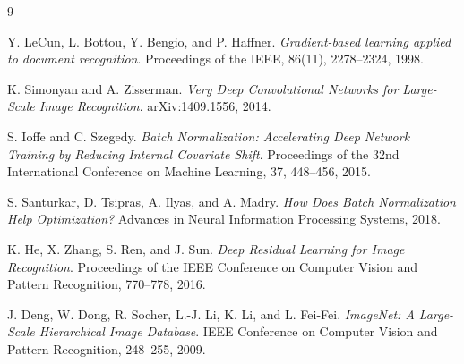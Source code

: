 \documentclass[11pt,a4paper]{article}
\begin{document}
\begin{thebibliography}{9}

Y. LeCun, L. Bottou, Y. Bengio, and P. Haffner.
\textit{Gradient-based learning applied to document recognition}.
Proceedings of the IEEE, 86(11), 2278--2324, 1998.

K. Simonyan and A. Zisserman.
\textit{Very Deep Convolutional Networks for Large-Scale Image Recognition}.
arXiv:1409.1556, 2014.

S. Ioffe and C. Szegedy.
\textit{Batch Normalization: Accelerating Deep Network Training by Reducing Internal Covariate Shift}.
Proceedings of the 32nd International Conference on Machine Learning, 37, 448--456, 2015.

S. Santurkar, D. Tsipras, A. Ilyas, and A. Madry.
\textit{How Does Batch Normalization Help Optimization?}
Advances in Neural Information Processing Systems, 2018.

K. He, X. Zhang, S. Ren, and J. Sun.
\textit{Deep Residual Learning for Image Recognition}.
Proceedings of the IEEE Conference on Computer Vision and Pattern Recognition, 770--778, 2016.

J. Deng, W. Dong, R. Socher, L.-J. Li, K. Li, and L. Fei-Fei.
\textit{ImageNet: A Large-Scale Hierarchical Image Database}.
IEEE Conference on Computer Vision and Pattern Recognition, 248--255, 2009.

\end{thebibliography}
\end{document}
